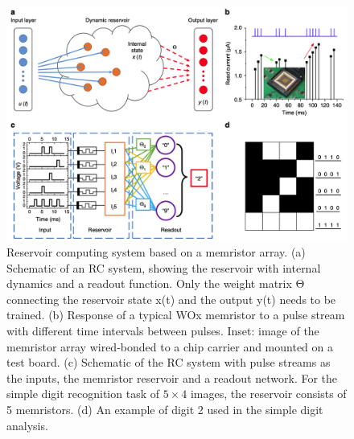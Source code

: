 \documentclass[11pt, oneside]{article}
\begin{document}
\begin{figure}[H]
    \centering
    \includegraphics[width=\textwidth]{figs/reservoir-memristor-1.png}

    \caption{Reservoir computing system based on a memristor array. (a) Schematic of an RC system, showing the reservoir with internal dynamics and a readout function. Only the weight matrix Θ connecting the reservoir state x(t) and the output y(t) needs to be trained. (b) Response of a typical WOx memristor to a pulse stream with different time intervals between pulses. Inset: image of the memristor array wired-bonded to a chip carrier and mounted on a test board. (c) Schematic of the RC system with pulse streams as the inputs, the memristor reservoir and a readout network. For the simple digit recognition task of \( 5 \times 4 \) images, the reservoir consists of 5 memristors. (d) An example of digit 2 used in the simple digit analysis.}
\end{figure}
\end{document}
